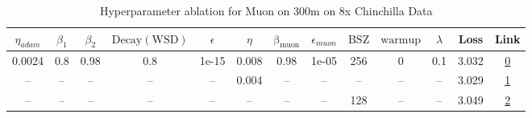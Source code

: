 \begin{table}[H]
\centering
\caption{Hyperparameter ablation for Muon on 300m on 8x Chinchilla Data}
\label{tab:ablation_muon_300m_8}
\begin{tabular}{ccccccccccccc}
\toprule
$\eta_{adam}$ & $\beta_1$ & $\beta_2$ & $\mathrm{Decay (WSD)}$ & $\epsilon$ & $\eta$ & $\mathrm{\beta_{muon}}$ & $\epsilon_{muon}$ & $\mathrm{BSZ}$ & $\mathrm{warmup}$ & $\lambda$ & Loss & Link \\
\midrule
0.0024 & 0.8 & 0.98 & 0.8 & 1e-15 & 0.008 & 0.98 & 1e-05 & 256 & 0 & 0.1 & 3.032 & \href{https://wandb.ai/stanford-mercury/optimizer-scaling/runs/sweep-300m-48B-muond28b65lr0.008-wd0.1-minlr0-warmup0-b10.8-b20.-3e14c1}{0} \\
\midrule
-- & -- & -- & -- & -- & 0.004 & -- & -- & -- & -- & -- & 3.029 & \href{https://wandb.ai/stanford-mercury/optimizer-scaling/runs/sweep-300m-48B-muont25115alr0.004-wd0.1-minlr0-warmup0-b10.8-b20-983da2}{1} \\
-- & -- & -- & -- & -- & -- & -- & -- & 128 & -- & -- & 3.049 & \href{https://wandb.ai/stanford-mercury/optimizer-scaling/runs/sweep-300m-48B-muonta4ae77lr0.008-wd0.1-minlr0-warmup0-b10.8-b20-41c572}{2} \\
\bottomrule
\end{tabular}
\end{table}

